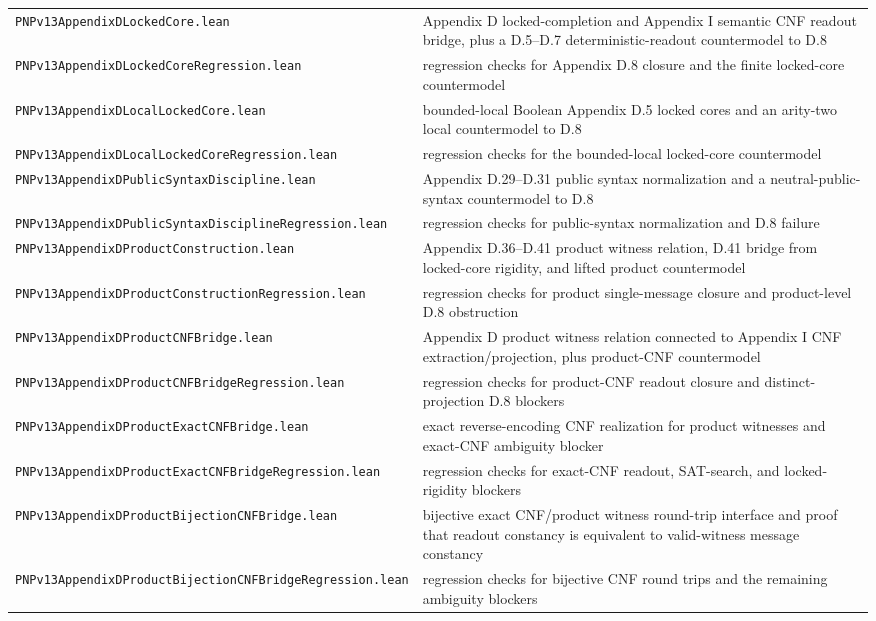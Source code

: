 \documentclass[11pt]{article}
\theoremstyle{remark}
\begin{document}
\begin{center}
\begin{tabular}{ll}
\texttt{PNPv13AppendixDLockedCore.lean} & Appendix D locked-completion and Appendix I semantic CNF readout bridge, plus a D.5--D.7 deterministic-readout countermodel to D.8 \\
\texttt{PNPv13AppendixDLockedCoreRegression.lean} & regression checks for Appendix D.8 closure and the finite locked-core countermodel \\
\texttt{PNPv13AppendixDLocalLockedCore.lean} & bounded-local Boolean Appendix D.5 locked cores and an arity-two local countermodel to D.8 \\
\texttt{PNPv13AppendixDLocalLockedCoreRegression.lean} & regression checks for the bounded-local locked-core countermodel \\
\texttt{PNPv13AppendixDPublicSyntaxDiscipline.lean} & Appendix D.29--D.31 public syntax normalization and a neutral-public-syntax countermodel to D.8 \\
\texttt{PNPv13AppendixDPublicSyntaxDisciplineRegression.lean} & regression checks for public-syntax normalization and D.8 failure \\
\texttt{PNPv13AppendixDProductConstruction.lean} & Appendix D.36--D.41 product witness relation, D.41 bridge from locked-core rigidity, and lifted product countermodel \\
\texttt{PNPv13AppendixDProductConstructionRegression.lean} & regression checks for product single-message closure and product-level D.8 obstruction \\
\texttt{PNPv13AppendixDProductCNFBridge.lean} & Appendix D product witness relation connected to Appendix I CNF extraction/projection, plus product-CNF countermodel \\
\texttt{PNPv13AppendixDProductCNFBridgeRegression.lean} & regression checks for product-CNF readout closure and distinct-projection D.8 blockers \\
\texttt{PNPv13AppendixDProductExactCNFBridge.lean} & exact reverse-encoding CNF realization for product witnesses and exact-CNF ambiguity blocker \\
\texttt{PNPv13AppendixDProductExactCNFBridgeRegression.lean} & regression checks for exact-CNF readout, SAT-search, and locked-rigidity blockers \\
\texttt{PNPv13AppendixDProductBijectionCNFBridge.lean} & bijective exact CNF/product witness round-trip interface and proof that readout constancy is equivalent to valid-witness message constancy \\
\texttt{PNPv13AppendixDProductBijectionCNFBridgeRegression.lean} & regression checks for bijective CNF round trips and the remaining ambiguity blockers \\

\end{tabular}
\end{center}
\end{document}
